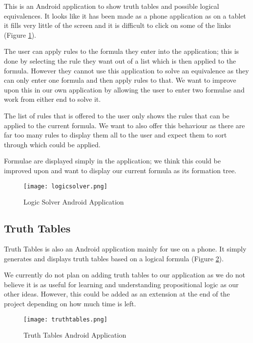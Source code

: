 \documentclass{report}
\begin{document}
This is an Android application to show truth tables and possible logical equivalences. It looks like it has been made as a phone application as on a tablet it fills very little of the screen and it is difficult to click on some of the links (Figure \ref{logicsolver}).

The user can apply rules to the formula they enter into the application; this is done by selecting the rule they want out of a list which is then applied to the formula. However they cannot use this application to solve an equivalence as they can only enter one formula and then apply rules to that. We want to improve upon this in our own application by allowing the user to enter two formulae and work from either end to solve it.

The list of rules that is offered to the user only shows the rules that can be applied to the current formula. We want to also offer this behaviour as there are far too many rules to display them all to the user and expect them to sort through which could be applied.

Formulae are displayed simply in the application; we think this could be improved upon and want to display our current formula as its formation tree.

\begin{figure}[ht]
    \centering
    \texttt{[image: logicsolver.png]}
    \caption{Logic Solver Android Application}
    \label{logicsolver}
\end{figure}

\subsection{Truth Tables}

Truth Tables is also an Android application mainly for use on a phone. It simply generates and displays truth tables based on a logical formula (Figure \ref{truthtables}).

We currently do not plan on adding truth tables to our application as we do not believe it is as useful for learning and understanding propositional logic as our other ideas. However, this could be added as an extension at the end of the project depending on how much time is left.

\begin{figure}[ht]
    \centering
    \texttt{[image: truthtables.png]}
    \caption{Truth Tables Android Application}
    \label{truthtables}
\end{figure}
\end{document}
